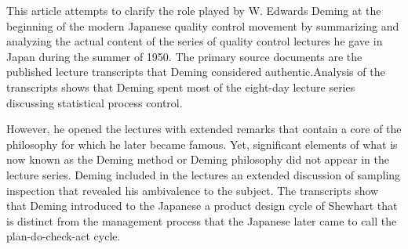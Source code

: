\documentclass[11pt]{article} %
\begin{document}

This article attempts to clarify the role played by W. Edwards Deming at the beginning of the modern Japanese quality control movement by summarizing and analyzing the actual content of the series of quality control lectures he gave in Japan during the summer of 1950. The primary source documents are the published lecture transcripts that Deming considered authentic.Analysis of the transcripts shows that Deming spent most of the eight-day lecture series discussing statistical process control. 


However, he opened the lectures with extended remarks that contain a core of the philosophy for which he later became famous. Yet, significant elements of what is now known as the Deming method or Deming philosophy did not appear in the lecture series. Deming included in the lectures an extended discussion of sampling inspection that revealed his ambivalence to the subject. The transcripts show that Deming introduced to the Japanese a product design cycle of Shewhart that is distinct from the management process that the Japanese later came to call the plan-do-check-act cycle.
\end{document}
